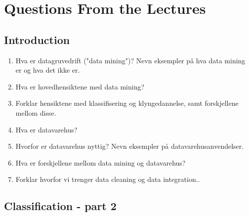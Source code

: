 \chapter{Questions From the Lectures}

	\section{Introduction}
		\begin{enumerate}
			\item Hva er datagruvedrift ("data mining")? Nevn eksempler på hva data mining er
			og hva det ikke er. 
			\item Hva er hovedhensiktene med data mining?
			\item Forklar hensiktene med klassifisering og klyngedannelse, samt forskjellene
			mellom disse. 
			\item Hva er datavarehus?
			\item Hvorfor er datavarehus nyttig? Nevn eksempler på datavarehusanvendelser.
			\item Hva er forskjellene mellom data mining og datavarehus?
			\item Forklar hvorfor vi trenger data cleaning og data integration..
		\end{enumerate}

	\section{Classification - part 2}

